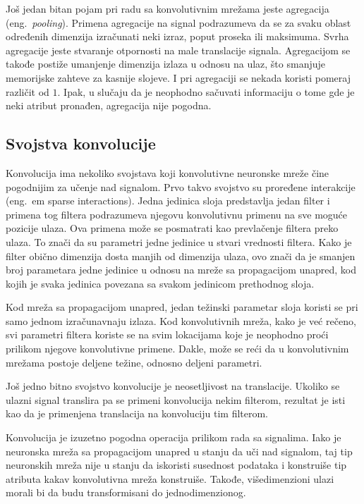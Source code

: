 \par 
Još jedan bitan pojam pri radu sa konvolutivnim mrežama jeste agregacija (eng.~{\em pooling}). Primena agregacije na signal podrazumeva da se za svaku oblast određenih dimenzija izračunati neki izraz, poput proseka ili maksimuma. Svrha agregacije jeste stvaranje otpornosti na male translacije signala. Agregacijom se takođe postiže umanjenje dimenzija izlaza u odnosu na ulaz, što smanjuje memorijske zahteve za kasnije slojeve. I pri agregaciji se nekada koristi pomeraj različit od $1$. Ipak, u slučaju da je neophodno sačuvati informaciju o tome gde je neki atribut pronađen, agregacija nije pogodna.
\subsection{Svojstva konvolucije}
Konvolucija ima nekoliko svojstava koji konvolutivne neuronske mreže čine pogodnijim za učenje nad signalom. Prvo takvo svojstvo su proređene interakcije (eng.~{em sparse interactions}). Jedna jedinica sloja predstavlja jedan filter i primena tog filtera podrazumeva njegovu konvolutivnu primenu na sve moguće pozicije ulaza. Ova primena može se posmatrati kao prevlačenje filtera preko ulaza. To znači da su parametri jedne jedinice u stvari vrednosti filtera. Kako je filter obično dimenzija dosta manjih od dimenzija ulaza, ovo znači da je smanjen broj parametara jedne jedinice u odnosu na mreže sa propagacijom unapred, kod kojih je svaka jedinica povezana sa svakom jedinicom prethodnog sloja. 
\par 
Kod mreža sa propagacijom unapred, jedan težinski parametar sloja koristi se pri samo jednom izračunavnaju izlaza. Kod konvolutivnih mreža, kako je već rečeno, svi parametri filtera koriste se na svim lokacijama koje je neophodno proći prilikom njegove konvolutivne primene. Dakle, može se reći da u konvolutivnim mrežama postoje deljene težine, odnosno deljeni parametri.
\par 
Još jedno bitno svojstvo konvolucije je neosetljivost na translacije. Ukoliko se ulazni signal translira pa se primeni konvolucija nekim filterom, rezultat je isti kao da je primenjena translacija na konvoluciju tim filterom.
\par 
Konvolucija je izuzetno pogodna operacija prilikom rada sa signalima. Iako je neuronska mreža sa propagacijom unapred u stanju da uči nad signalom, taj tip neuronskih mreža nije u stanju da iskoristi susednost podataka i konstruiše tip atributa kakav konvolutivna mreža konstruiše. Takođe, višedimenzioni ulazi morali bi da budu transformisani do jednodimenzionog. 
